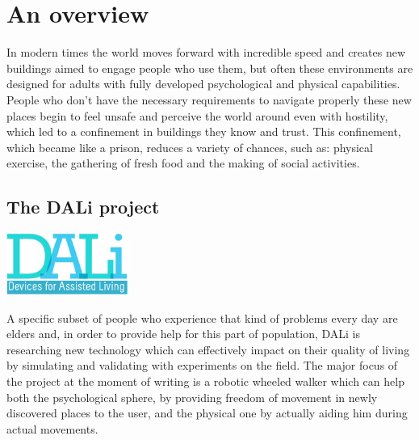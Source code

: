 \chapter{An overview}

\vspace{5cm}
In modern times the world moves forward with incredible speed and creates new buildings aimed to engage people who use them, but often these environments are designed for adults with fully developed psychological and physical capabilities.
People who don't have the necessary requirements to navigate properly these new places begin to feel unsafe and perceive the world around even with hostility, which led to a confinement in buildings they know and trust.
This confinement, which became like a prison, reduces a variety of chances, such as: physical exercise, the gathering of fresh food and the making of social activities.

\newpage

\section{The DALi project}

\vspace{1cm}
\begin{center}
      \includegraphics[width=0.3\textwidth]{img/Dali-logo.png}
\end{center}
\vspace{1cm}

A specific subset of people who experience that kind of problems every day are elders and, in order to provide help for this part of population, DALi is researching new technology which can effectively impact on their quality of living by simulating and validating with experiments on the field.
\newline
The major focus of the project at the moment of writing is a robotic wheeled walker which can help both the psychological sphere, by providing freedom of movement in newly discovered places to the user, and the physical one by actually aiding him during actual movements.

